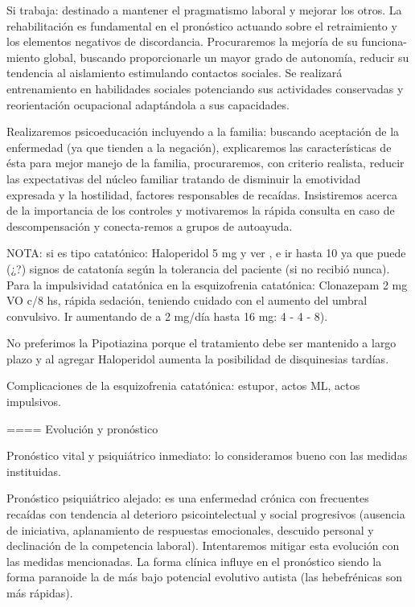 \documentclass[encares.tex]{subfiles}
\begin{document}
Si trabaja: destinado a mantener el pragmatismo laboral y mejorar los otros. La rehabilitación es fundamental en el pronóstico actuando sobre el retraimiento y los elementos negativos de discordancia. Procuraremos la mejoría de su funciona-miento global, buscando proporcionarle un mayor grado de autonomía, reducir su tendencia al aislamiento estimulando contactos sociales. Se realizará entrenamiento en habilidades sociales potenciando sus actividades conservadas y reorientación ocupacional adaptándola a sus capacidades.

Realizaremos psicoeducación incluyendo a la familia: buscando aceptación de la enfermedad (ya que tienden a la negación), explicaremos las características de ésta para mejor manejo de la familia, procuraremos, con criterio realista, reducir las expectativas del núcleo familiar tratando de disminuir la emotividad expresada y la hostilidad, factores responsables de recaídas. Insistiremos acerca de la importancia de los controles y motivaremos la rápida consulta en caso de descompensación y conecta-remos a grupos de autoayuda.

NOTA: si es tipo catatónico: Haloperidol 5 mg y ver , e ir hasta 10 ya que puede (¿?) signos de catatonía según la tolerancia del paciente (si no recibió nunca). Para la impulsividad catatónica en la esquizofrenia catatónica: Clonazepam 2 mg VO c/8 hs, rápida sedación, teniendo cuidado con el aumento del umbral convulsivo. Ir aumentando de a 2 mg/día hasta 16 mg: 4 - 4 - 8).

No preferimos la Pipotiazina porque el tratamiento debe ser mantenido a largo plazo y al agregar Haloperidol aumenta la posibilidad de disquinesias tardías.

Complicaciones de la esquizofrenia catatónica: estupor, actos ML, actos impulsivos.

==== Evolución y pronóstico

Pronóstico vital y psiquiátrico inmediato: lo consideramos bueno con las medidas instituidas.

Pronóstico psiquiátrico alejado: es una enfermedad crónica con frecuentes recaídas con tendencia al deterioro psicointelectual y social progresivos (ausencia de iniciativa, aplanamiento de respuestas emocionales, descuido personal y declinación de la competencia laboral). Intentaremos mitigar esta evolución con las medidas mencionadas. La forma clínica influye en el pronóstico siendo la forma paranoide la de más bajo potencial evolutivo autista (las hebefrénicas son más rápidas).
\end{document}
